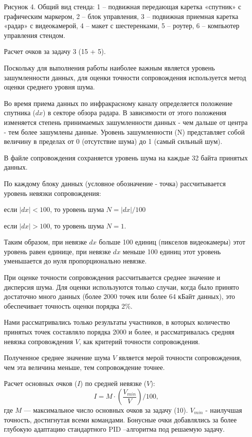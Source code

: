 
\begin{center}
    Рисунок 4. Общий вид стенда: 1 – подвижная передающая каретка «спутник» с графическим маркером, 2 – блок управления, 3 – подвижная приемная каретка «радар» с видеокамерой, 4 – макет с шестеренками, 5 – роутер, 6 – компьютер управления стендом.
\end{center}

\markSection

Расчет очков за задачу 3 (15 + 5).

Поскольку для выполнения работы наиболее важным является уровень зашумленности данных, для оценки точности сопровождения используется метод оценки среднего уровня шума.

Во время приема данных по инфракрасному каналу определяется положение спутника ($dx$) в секторе обзора радара. В зависимости от этого положения изменяется степень принимаемых зашумленности данных - чем дальше от центра - тем более зашумлены данные. Уровень зашумленности (N) представляет собой величину в пределах от 0 (отсутствие шума) до 1 (самый сильный шум).

В файле сопровождения сохраняется уровень шума на каждые 32 байта принятых данных.

По каждому блоку данных (условное обозначение - точка) рассчитывается уровень невязки сопровождения:

	если $|dx|< 100$, то уровень шума $N=|dx|/100$

    если $|dx| > 100$, то уровень шума $N=1$.

Таким образом, при невязке $dx$ больше 100 единиц (пикселов видеокамеры) этот уровень равен единице, при невязке $dx$ меньше 100 единиц этот уровень уменьшается до нуля пропорционально невязке.

При оценке точности сопровождения рассчитывается среднее значение и дисперсия шума.  Для оценки используются только случаи, когда было принято достаточно много данных (более 2000 точек или более 64 кБайт данных), это обеспечивает точность оценки порядка 2\%.

Нами рассматривались только результаты участников, в которых количество принятых точек составляло порядка 2000 и более, и рассматривалась средняя невязка сопровождения $V$, как критерий точности сопровождения.

Полученное среднее значение шума $V$ является мерой точности сопровождения, чем эта величина меньше, тем сопровождение точнее.

Расчет основных очков ($I$) по средней невязке ($V$): 
$$I = M \cdot \left(\frac{V_{min}}{V}\right)/100,$$ 
где $M$ — максимальное число основных очков за задачу (10). $V_{min}$ - наилучшая точность, достигнутая всеми командами. Бонусные очки добавлялись за более глубокую адаптацию стандартного PID –алгоритма под решаемую задачу.
